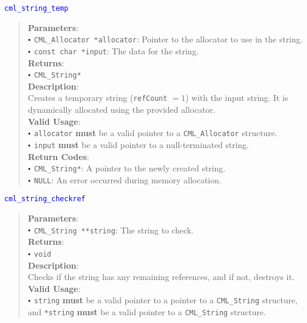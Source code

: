 \documentclass[a4paper,oneside,8pt]{extarticle}
\newcommand{\function}[1]{
  \noindent\textcolor{blue}{\texttt{#1}}
  \vspace{-0.3em}
}
\renewcommand{\dot}{\raisebox{0.3ex}{\scalebox{0.6}{$\bullet$}}}
\theoremstyle{definition}
\begin{document}
\function{cml\_string\_temp}
\begin{quote}
  \textbf{Parameters}: \\
  $\dot$ \texttt{CML\_Allocator *allocator}: Pointer to the allocator to use in the string. \\
  $\dot$ \texttt{const char *input}: The data for the string. \\
  \textbf{Returns}: \\
  $\dot$ \texttt{CML\_String*} \\
  
  \vspace{-0.75em}
  \textbf{Description}: \\
  Creates a temporary string (\texttt{refCount} $=1$) with the input string. It is dynamically allocated using the provided allocator. \\

  \vspace{-0.75em}
  \textbf{Valid Usage}: \\
  $\dot$ \texttt{allocator} \textbf{must} be a valid pointer to a \texttt{CML\_Allocator} structure. \\
  $\dot$ \texttt{input} \textbf{must} be a valid pointer to a null-terminated string. \\

  \vspace{-0.75em}
  \textbf{Return Codes}: \\
  $\dot$ \texttt{CML\_String*}: A pointer to the newly created string. \\
  $\dot$ \texttt{NULL}: An error occurred during memory allocation. \\
\end{quote}

\function{cml\_string\_checkref}
\begin{quote}
  \textbf{Parameters}: \\
  $\dot$ \texttt{CML\_String **string}: The string to check. \\
  \textbf{Returns}: \\
  $\dot$ \texttt{void} \\
  
  \vspace{-0.75em}
  \textbf{Description}: \\
  Checks if the string has any remaining references, and if not, destroys it. \\

  \vspace{-0.75em}
  \textbf{Valid Usage}: \\
  $\dot$ \texttt{string} \textbf{must} be a valid pointer to a pointer to a \texttt{CML\_String} structure, and \texttt{*string} \textbf{must} be a valid pointer to a \texttt{CML\_String} structure. \\
\end{quote}
\end{document}
